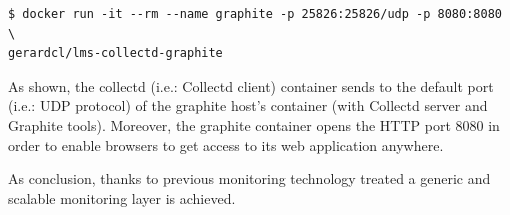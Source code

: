 \begin{verbatim}
$ docker run -it --rm --name graphite -p 25826:25826/udp -p 8080:8080 \
gerardcl/lms-collectd-graphite
\end{verbatim}

As shown, the collectd (i.e.: Collectd client) container sends to the default port (i.e.: UDP protocol) of the graphite host's container (with Collectd server and Graphite tools). Moreover, the graphite container opens the HTTP port 8080 in order to enable browsers to get access to its web application anywhere. 

As conclusion, thanks to previous monitoring technology treated a generic and scalable monitoring layer is achieved.